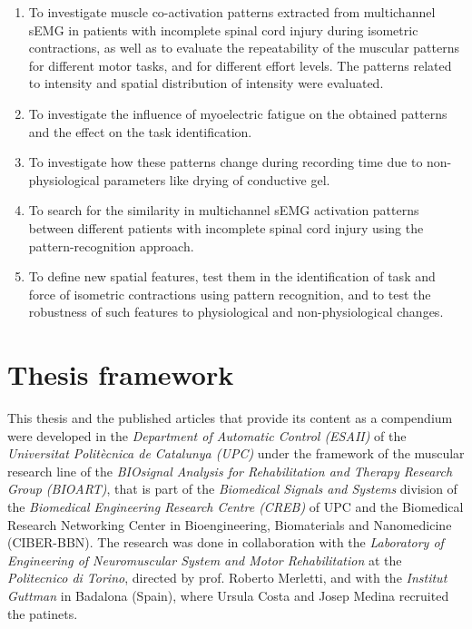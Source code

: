 \begin{enumerate}[I]

\item To investigate muscle co-activation patterns extracted from multichannel sEMG in patients with incomplete spinal cord injury during isometric contractions, as well as to evaluate the repeatability of the muscular patterns for different motor tasks, and for different effort levels. The patterns related to intensity and spatial distribution of intensity were evaluated.

\item To investigate the influence of myoelectric fatigue on the obtained patterns and the effect on the task identification.

\item To investigate how these patterns change during recording time due to non-physiological parameters like drying of conductive gel.

\item To search for the similarity in multichannel sEMG activation patterns between different patients with incomplete spinal cord injury using the pattern-recognition approach.

\item To define new spatial features, test them in the identification of task and force of isometric contractions using pattern recognition, and to test the robustness of such features to physiological and non-physiological changes.


\end{enumerate}

     \section{Thesis framework}
     
This thesis and the published articles that provide its content as a compendium were developed in the \emph{Department of Automatic Control (ESAII)} of the \emph{Universitat Polit\`{e}cnica de Catalunya (UPC)} under the framework of the muscular research line of the \emph{BIOsignal Analysis for Rehabilitation and Therapy Research Group (BIOART)}, that is part of the \emph{Biomedical Signals and Systems} division of the \emph{Biomedical Engineering Research Centre (CREB)} of UPC and the Biomedical Research Networking Center in Bioengineering, Biomaterials and Nanomedicine (CIBER-BBN). The research was done in collaboration with the \emph{Laboratory of Engineering of Neuromuscular System and Motor Rehabilitation} at the \emph{Politecnico di Torino}, directed by prof. Roberto Merletti, and with the \emph{Institut Guttman} in Badalona (Spain), where Ursula Costa and Josep Medina recruited the patinets.

